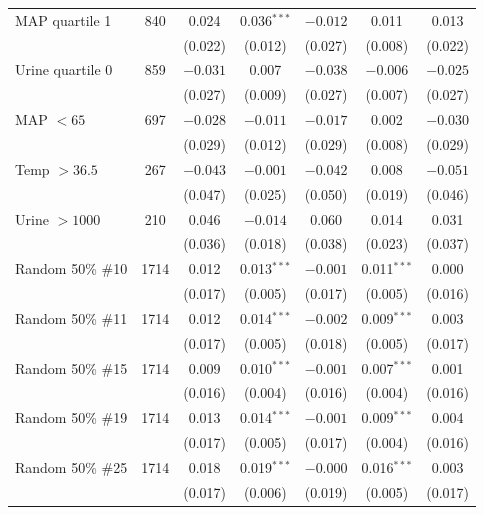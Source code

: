 \begin{table}[H]
\begin{tabular}{@{}lc*{5}{c}@{}}
    MAP quartile 1 & 840 & 0.024 & 0.036$^{***}$ & $-0.012$ & 0.011 & 0.013 \\
    & & (0.022) & (0.012) & (0.027) & (0.008) & (0.022) \\[0.3em]
    
    Urine quartile 0 & 859 & $-0.031$ & 0.007 & $-0.038$ & $-0.006$ & $-0.025$ \\
    & & (0.027) & (0.009) & (0.027) & (0.007) & (0.027) \\[0.3em]
    
    MAP $< 65$ & 697 & $-0.028$ & $-0.011$ & $-0.017$ & 0.002 & $-0.030$ \\
    & & (0.029) & (0.012) & (0.029) & (0.008) & (0.029) \\[0.3em]
    
    Temp $> 36.5$ & 267 & $-0.043$ & $-0.001$ & $-0.042$ & 0.008 & $-0.051$ \\
    & & (0.047) & (0.025) & (0.050) & (0.019) & (0.046) \\[0.3em]
    
    Urine $> 1000$ & 210 & 0.046 & $-0.014$ & 0.060 & 0.014 & 0.031 \\
    & & (0.036) & (0.018) & (0.038) & (0.023) & (0.037) \\[0.3em]
    
    Random 50\% \#10 & 1714 & 0.012 & 0.013$^{***}$ & $-0.001$ & 0.011$^{***}$ & 0.000 \\
    & & (0.017) & (0.005) & (0.017) & (0.005) & (0.016) \\[0.3em]
    
    Random 50\% \#11 & 1714 & 0.012 & 0.014$^{***}$ & $-0.002$ & 0.009$^{***}$ & 0.003 \\
    & & (0.017) & (0.005) & (0.018) & (0.005) & (0.017) \\[0.3em]
    
    Random 50\% \#15 & 1714 & 0.009 & 0.010$^{***}$ & $-0.001$ & 0.007$^{***}$ & 0.001 \\
    & & (0.016) & (0.004) & (0.016) & (0.004) & (0.016) \\[0.3em]
    
    Random 50\% \#19 & 1714 & 0.013 & 0.014$^{***}$ & $-0.001$ & 0.009$^{***}$ & 0.004 \\
    & & (0.017) & (0.005) & (0.017) & (0.004) & (0.016) \\[0.3em]
    
    Random 50\% \#25 & 1714 & 0.018 & 0.019$^{***}$ & $-0.000$ & 0.016$^{***}$ & 0.003 \\
    & & (0.017) & (0.006) & (0.019) & (0.005) & (0.017) \\[0.3em]
    

\end{tabular}
\end{table}
